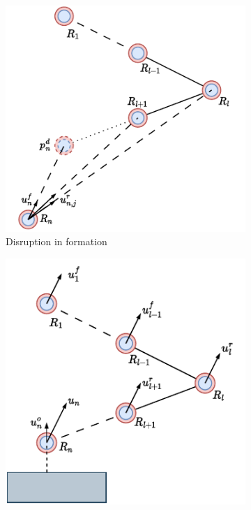 \begin{figure}
    \centering
    \begin{subfigure}[b]{0.32\textwidth}
    \includegraphics[width=\textwidth]{paper1/images/reconfiguration0.pdf}
    \caption{Disruption in formation}
    \label{fig:chap2_reconfig0}
    \end{subfigure}
    \begin{subfigure}[b]{0.32\textwidth}
    \includegraphics[width=\textwidth]{paper1/images/reconfiguration1.pdf}

\end{subfigure}
\end{figure}
